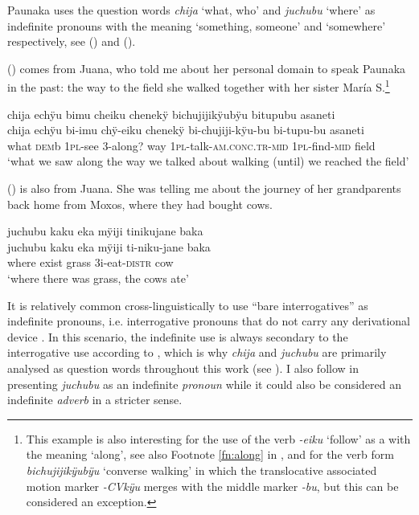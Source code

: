 Paunaka uses the question words \textit{chija} ‘what, who’ and \textit{juchubu} ‘where’ as indefinite pronouns with the meaning ‘something, someone’ and ‘somewhere’ respectively, see () and ().

() comes from Juana, who told me about her personal domain to speak Paunaka in the past: the way to the field she walked together with her sister María S.\footnote{This example is also interesting for the use of the verb \textit{-eiku} ‘follow’ as a  with the meaning ‘along’, see also Footnote \ref{fn:along} in , and for the verb form \textit{bichujijikÿubÿu} ‘converse walking’ in which the translocative associated motion marker \textit{-CVkÿu} merges with the middle marker \textit{-bu}, but this can be considered an exception.}

\ea\label{ex:chija-INDEF2}
\begingl
\glpreamble chija echÿu bimu cheiku chenekÿ bichujijikÿubÿu bitupubu asaneti\\
\gla chija echÿu bi-imu chÿ-eiku chenekÿ bi-chujiji-kÿu-bu bi-tupu-bu asaneti\\
\glb what \textsc{dem}b 1\textsc{pl}-see 3-along? way 1\textsc{pl}-talk-\textsc{am.conc.tr}-\textsc{mid} 1\textsc{pl}-find-\textsc{mid} field\\
\glft ‘what we saw along the way we talked about walking (until) we reached the field’
\endgl
\trailingcitation{[jxx-p120430l-1.053]}
\xe

() is also from Juana. She was telling me about the journey of her grandparents back home from Moxos, where they had bought cows.

\ea\label{ex:juchubu-INDEF2}
\begingl
\glpreamble juchubu kaku eka mÿiji tinikujane baka\\
\gla juchubu kaku eka mÿiji ti-niku-jane baka\\
\glb where exist grass 3i-eat-\textsc{distr} cow\\
\glft ‘where there was grass, the cows ate’
\endgl
\trailingcitation{[jxx-p151016l-2.047]}
\xe

It is relatively common cross-linguistically to use “bare interrogatives” as indefinite pronouns, i.e. interrogative pronouns that do not carry any derivational device \citep[170, 174]{Haspelmath2001}. In this scenario, the indefinite use is always secondary to the interrogative use according to \citet[5]{Haspelmath2001}, which is why \textit{chija} and \textit{juchubu} are primarily analysed as question words throughout this work (see ). I also follow \citet{Haspelmath2001} in presenting \textit{juchubu} as an indefinite \textit{pronoun} while it could also be considered an indefinite \textit{adverb} in a stricter sense.

